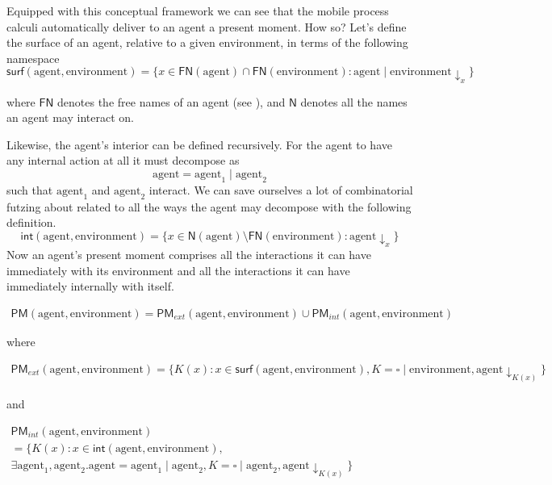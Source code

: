 \documentclass{article}
\newcommand{\parcomp}{\mid}
\begin{document}
Equipped with this conceptual framework we can see that the mobile process calculi automatically deliver to an agent a present moment. How so? Let's define the surface of an agent, relative to a given environment, in terms of the following namespace
\[
  \mathsf{surf}(\text{agent}, \text{environment}) = \{ x \in \mathsf{FN}(\text{agent}) \cap \mathsf{FN}(\text{environment}) : \text{agent} \parcomp \text{environment} \downarrow_{x} \}
  \]

  where $\mathsf{FN}$ denotes the free names of an agent (see \cite{DBLP:journals/entcs/MeredithR05}), and $\mathsf{N}$ denotes all the names an agent may interact on.
  
Likewise, the agent's interior can be defined recursively. For the agent to have any internal action at all it must decompose as
\[
  \text{agent} = \text{agent}_1 \parcomp \text{agent}_2
\]
such that $\text{agent}_1$ and $\text{agent}_2$ interact. We can save ourselves a lot of combinatorial futzing about related to all the ways the agent may decompose with the following definition.
\[
  \mathsf{int}(\text{agent}, \text{environment}) = \{ x \in \mathsf{N}(\text{agent}) \setminus \mathsf{FN}( \text{environment} ) : \text{agent} \downarrow_{x} \}
\]
Now an agent's present moment comprises all the interactions it can have immediately with its environment and all the interactions it can have immediately internally with itself. 

\begin{align*}
  \mathsf{PM}(\text{agent}, \text{environment}) =
  \mathsf{PM}_{ext}(\text{agent}, \text{environment})
  \cup \mathsf{PM}_{int}(\text{agent}, \text{environment})
\end{align*}

where

\begin{align*}
  \mathsf{PM}_{ext}(\text{agent}, \text{environment}) =
  \{ K( x ) : x \in \mathsf{surf}(\text{agent}, \text{environment}),
  K = \square \parcomp \text{environment},
  \text{agent}\downarrow_{K(x)} \}
\end{align*}

and

\begin{align*}
  \mathsf{PM}_{int}(\text{agent}, \text{environment}) \quad\quad\quad\quad\quad\quad\quad\quad\quad\quad\quad\quad\quad\quad\quad\quad\quad\quad\quad\quad\quad\quad\quad\quad& & \\
  = \{ K( x ) : x \in \mathsf{int}(\text{agent}, \text{environment}), \quad\quad\quad\quad\quad\quad\quad\quad\quad\quad\quad\quad\quad\quad\quad\quad\quad\quad\\
  \exists \text{agent}_1, \text{agent}_2 . \text{agent} = \text{agent}_1 \parcomp \text{agent}_2,
  K = \square \parcomp \text{agent}_{2},
  \text{agent}\downarrow_{K(x)} \}
\end{align*}
\end{document}
